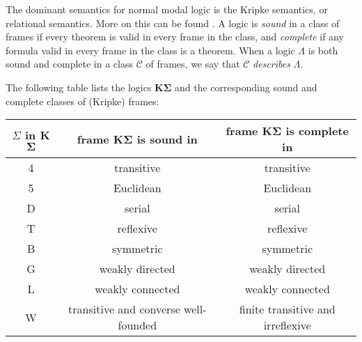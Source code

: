 \documentclass[12pt]{article}
\begin{document}
The dominant semantics for normal modal logic is the Kripke semantics, or relational semantics.  More on this can be found .  A logic is \emph{sound} in a class of frames if every theorem is valid in every frame in the class, and \emph{complete} if any formula valid in every frame in the class is a theorem.  When a logic $\Lambda$ is both sound and complete in a class $\mathcal{C}$ of frames, we say that $\mathcal{C}$ \emph{describes} $\Lambda$.


The following table lists the logics \textbf{K}$\mathbf{\Sigma}$ and the corresponding sound and complete classes of (Kripke) frames:
\begin{center}
\begin{tabular}{|c|c|c|}
\hline
$\Sigma$ in  \textbf{K}$\mathbf{\Sigma}$ & frame \textbf{K}$\mathbf{\Sigma}$ is sound in & frame \textbf{K}$\mathbf{\Sigma}$ is complete in \\
\hline\hline
4 & transitive & transitive \\
\hline
5 & Euclidean & Euclidean \\
\hline
D & serial & serial \\
\hline
T & reflexive & reflexive \\
\hline
B & symmetric & symmetric \\
\hline
G & weakly directed & weakly directed \\
\hline
L & weakly connected & weakly connected \\
\hline
W & transitive and converse well-founded & finite transitive and irreflexive \\
\hline
\end{tabular}
\end{center}

\end{document}
